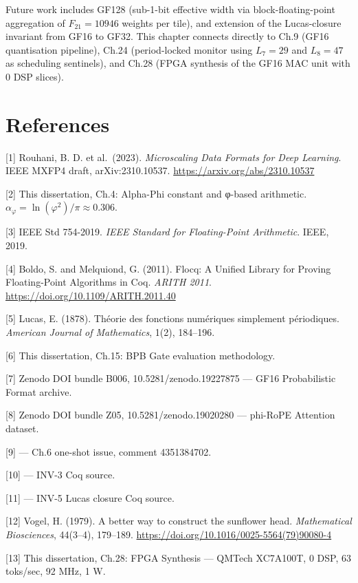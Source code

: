 Future work includes GF128 (sub-1-bit effective
width via block-floating-point aggregation of
\(F_{21}=10946\) weights per tile), and extension
of the Lucas-closure invariant from GF16 to GF32.
This chapter connects directly to Ch.9 (GF16
quantisation pipeline), Ch.24 (period-locked
monitor using \(L_7=29\) and \(L_8=47\) as
scheduling sentinels), and Ch.28 (FPGA synthesis
of the GF16 MAC unit with 0 DSP slices).

\section{References}\label{fa_06:references}

[1] Rouhani, B. D. et al.~(2023).
\emph{Microscaling Data Formats for Deep
Learning}. IEEE MXFP4 draft, arXiv:2310.10537.
\url{https://arxiv.org/abs/2310.10537}

[2] This dissertation, Ch.4: Alpha-Phi
constant and φ-based arithmetic.
\(\alpha_\varphi = \ln(\varphi^2)/\pi \approx 0.306\).

[3] IEEE Std 754-2019. \emph{IEEE Standard for
Floating-Point Arithmetic}. IEEE, 2019.

[4] Boldo, S. and Melquiond, G. (2011). Flocq:
A Unified Library for Proving Floating-Point
Algorithms in Coq. \emph{ARITH 2011}.
\url{https://doi.org/10.1109/ARITH.2011.40}

[5] Lucas, E. (1878). Théorie des fonctions
numériques simplement périodiques. \emph{American
Journal of Mathematics}, 1(2), 184--196.

[6] This dissertation, Ch.15: BPB Gate
evaluation methodology.

[7] Zenodo DOI bundle B006,
10.5281/zenodo.19227875 --- GF16 Probabilistic
Format archive.

[8] Zenodo DOI bundle Z05,
10.5281/zenodo.19020280 --- phi-RoPE Attention
dataset.

[9]  --- Ch.6
one-shot issue, comment 4351384702.

[10]
--- INV-3 Coq source.

[11]
--- INV-5 Lucas closure Coq source.

[12] Vogel, H. (1979). A better way to
construct the sunflower head. \emph{Mathematical
Biosciences}, 44(3--4), 179--189.
\url{https://doi.org/10.1016/0025-5564(79)90080-4}

[13] This dissertation, Ch.28: FPGA Synthesis
--- QMTech XC7A100T, 0 DSP, 63 toks/sec, 92 MHz, 1
W.

